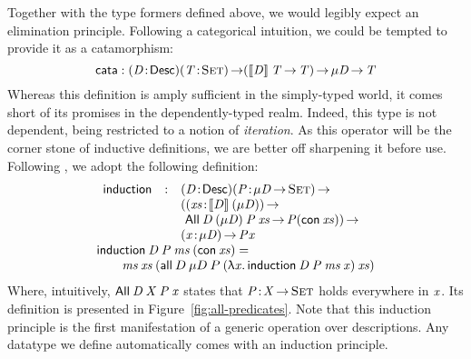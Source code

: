 Together with the type formers defined above, we would legibly expect
an elimination principle. Following a categorical intuition, we could
be tempted to provide it as a catamorphism:
%
\[
\F{cata} : \PITEL{\V{D}}{\Desc}
           \PI{\V{T}}{\Set}
           (\descop{\V{D}}{\V{T}} \To \V{T}) \To 
           \Mu{\V{D}} \To \V{T} 
\]
%
Whereas this definition is amply sufficient in the simply-typed world,
it comes short of its promises in the dependently-typed realm. Indeed,
this type is not dependent, being restricted to a notion of
\emph{iteration}. As this operator will be the corner stone of
inductive definitions, we are better off sharpening it before use.
Following \citet{benke:universe-generic-prog}, we adopt the following
definition:
%
\[\stk{
\begin{array}{lcl}
\F{induction} & : & \PITEL{\V{D}}{\Desc}
                    \PI{\V{P}}{\Mu{\V{D}} \To \Set}         \\
              &   & (\PI{\V{xs}}{\descop{\V{D}}{(\Mu{\V{D}})}}              \\
              &   & \ \All{\V{D}}{(\Mu{\V{D}})}{\V{P}}{\V{xs}} \To \V{P} (\Con{\V{xs}})) \To \\
              &   & \PI{\V{x}}{\Mu{\V{D}}} \V{P} \V{x} 
\end{array} \\
\F{induction}\: \V{D}\: \V{P}\: \V{ms}\: (\Con{\V{xs}}) =  \\
\qquad
    \V{ms}\: \V{xs}\: (\all{D}{\Mu{D}}{P}
                           {(\LAM{\V{x}} \F{induction}\: \V{D}\: \V{P}\: \V{ms}\: \V{x})}
                           {\V{xs}})
}\]
%
Where, intuitively, $\All{\V{D}}{\V{X}}{\V{P}}{\V{x}}$ states that
$\Bhab{\V{P}}{\V{X} \To \Set}$ holds everywhere in $\V{x}$. Its
definition is presented in Figure~\ref{fig:all-predicates}. Note that
this induction principle is the first manifestation of a generic
operation over descriptions. Any datatype we define automatically
comes with an induction principle.



